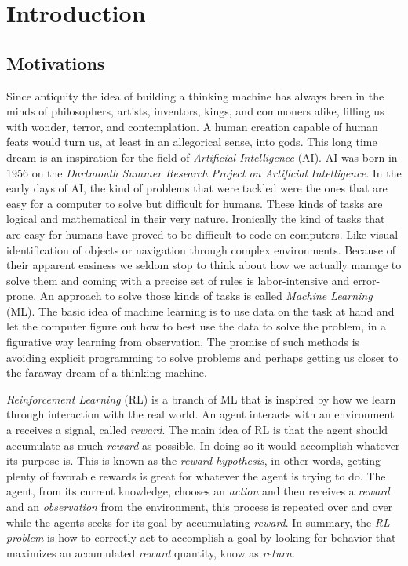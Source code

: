 \documentclass[
  12pt,
  openany]{book}
\begin{document}
\hypertarget{introduction}{%
\chapter{Introduction}\label{introduction}}

\hypertarget{motivations}{%
\section{Motivations}\label{motivations}}

Since antiquity the idea of building a thinking machine has always been in the minds of philosophers, artists, inventors, kings, and commoners alike, filling us with wonder, terror, and contemplation. A human creation capable of human feats would turn us, at least in an allegorical sense, into gods. This long time dream is an inspiration for the field of \emph{Artificial Intelligence} (AI). AI was born in 1956 on the \emph{Dartmouth Summer Research Project on Artificial Intelligence}. In the early days of AI, the kind of problems that were tackled were the ones that are easy for a computer to solve but difficult for humans. These kinds of tasks are logical and mathematical in their very nature. Ironically the kind of tasks that are easy for humans have proved to be difficult to code on computers. Like visual identification of objects or navigation through complex environments. Because of their apparent easiness we seldom stop to think about how we actually manage to solve them and coming with a precise set of rules is labor-intensive and error-prone. An approach to solve those kinds of tasks is called \emph{Machine Learning} (ML). The basic idea of machine learning is to use data on the task at hand and let the computer figure out how to best use the data to solve the problem, in a figurative way learning from observation. The promise of such methods is avoiding explicit programming to solve problems and perhaps getting us closer to the faraway dream of a thinking machine.

\emph{Reinforcement Learning} (RL) is a branch of ML that is inspired by how we learn through interaction with the real world. An agent interacts with an environment a receives a signal, called \emph{reward}. The main idea of RL is that the agent should accumulate as much \emph{reward} as possible. In doing so it would accomplish whatever its purpose is. This is known as the \emph{reward hypothesis}, in other words, getting plenty of favorable rewards is great for whatever the agent is trying to do. The agent, from its current knowledge, chooses an \emph{action} and then receives a \emph{reward} and an \emph{observation} from the environment, this process is repeated over and over while the agents seeks for its goal by accumulating \emph{reward}. In summary, the \emph{RL problem} is how to correctly act to accomplish a goal by looking for behavior that maximizes an accumulated \emph{reward} quantity, know as \emph{return}.
\end{document}
